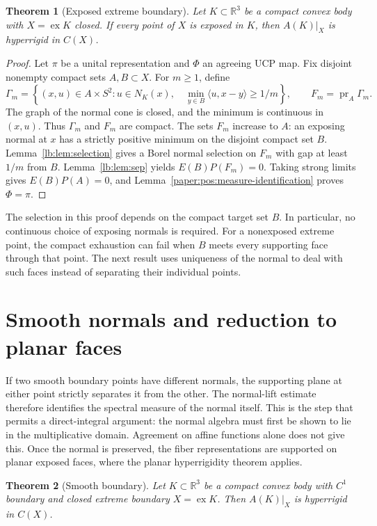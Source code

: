 \documentclass[11pt,letterpaper]{amsart}
\newtheorem{theorem}{Theorem}[section]
\theoremstyle{definition}
\theoremstyle{remark}
\numberwithin{equation}{section}
\DeclareMathOperator{\ex}{ex}
\begin{document}
\begin{theorem}[Exposed extreme boundary]\label{lb:thm:exposed}
Let $K\subset\mathbb R^3$ be a compact convex body with
$X=\ex K$ closed. If every point of $X$ is exposed in $K$,
then $A(K)|_X$ is hyperrigid in $C(X)$.
\end{theorem}
\begin{proof}
Let $\pi$ be a unital representation and $\Phi$ an agreeing
UCP map. Fix disjoint nonempty compact sets $A,B\subset X$.
For $m\ge1$, define
\[
 \Gamma_m=\left\{(x,u)\in A\times S^2:
    u\in N_K(x),\quad
    \min_{y\in B}\langle u,x-y\rangle\ge1/m\right\},
 \qquad F_m=\operatorname{pr}_A\Gamma_m.
\]
The graph of the normal cone is closed, and the minimum is
continuous in $(x,u)$. Thus $\Gamma_m$ and $F_m$ are compact.
The sets $F_m$ increase to $A$: an exposing normal at $x$
has a strictly positive minimum on the disjoint compact set
$B$. Lemma~\ref{lb:lem:selection} gives a Borel normal
selection on $F_m$ with gap at least $1/m$ from $B$.
Lemma~\ref{lb:lem:sep} yields $E(B)P(F_m)=0$.
Taking strong limits gives $E(B)P(A)=0$, and
Lemma~\ref{paper:pos:measure-identification} proves
$\Phi=\pi$.
\end{proof}

The selection in this proof depends on the compact target
set $B$. In particular, no continuous choice of exposing
normals is required. For a nonexposed extreme point, the
compact exhaustion can fail when $B$ meets every supporting
face through that point. The next result uses uniqueness of
the normal to deal with such faces instead of separating
their individual points.

\section{Smooth normals and reduction to planar faces}
\label{paper:pos:smooth}

If two smooth boundary points have different normals, the
supporting plane at either point strictly separates it from
the other. The normal-lift estimate therefore identifies the
spectral measure of the normal itself. This is the step that
permits a direct-integral argument: the normal algebra must
first be shown to lie in the multiplicative domain. Agreement on
affine functions alone does not give this. Once the normal is preserved,
the fiber representations are supported on planar exposed faces, where
the planar hyperrigidity theorem applies.

\begin{theorem}[Smooth boundary]\label{lb:thm:c1}
Let $K\subset\mathbb R^3$ be a compact convex body with
$C^1$ boundary and closed extreme boundary $X=\ex K$.
Then $A(K)|_X$ is hyperrigid in $C(X)$.
\end{theorem}
\end{document}
